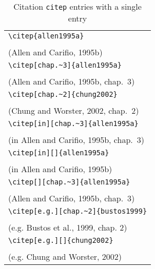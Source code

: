 \documentclass{article}
\begin{document}
\begin{table}
\begin{center}
\begin{tabular}{l}
    \verb#\citep{allen1995a}# \\
    \citep{allen1995a} \\
    (Allen and Carifio, 1995b)\\
\hline
    \verb#\citep[chap.~3]{allen1995a}# \\
    \citep[chap.~3]{allen1995a} \\
    (Allen and Carifio, 1995b, chap.~3)\\
\hline
    \verb#\citep[chap.~2]{chung2002}#\\
    \citep[chap.~2]{chung2002} \\
    (Chung and Worster, 2002, chap.~2)\\
\hline
    \verb#\citep[in][chap.~3]{allen1995a}# \\
    \citep[in][chap.~3]{allen1995a} \\
    (in Allen and Carifio, 1995b, chap.~3)\\
\hline
    \verb#\citep[in][]{allen1995a}# \\
    \citep[in][]{allen1995a} \\
    (in Allen and Carifio, 1995b)\\
\hline
    \verb#\citep[][chap.~3]{allen1995a}# \\
    \citep[][chap.~3]{allen1995a} \\
    (Allen and Carifio, 1995b, chap.~3)\\
\hline
    \verb#\citep[e.g.][chap.~2]{bustos1999}#\\
    \citep[e.g.][chap.~2]{bustos1999} \\
    (e.g. Bustos et al., 1999, chap. 2)\\
\hline
    \verb#\citep[e.g.][]{chung2002}#\\
    \citep[e.g.][]{chung2002} \\
    (e.g. Chung and Worster, 2002)\\
\end{tabular}
\end{center}
\caption{Citation \texttt{citep} entries with a single entry}
\end{table}
\end{document}
